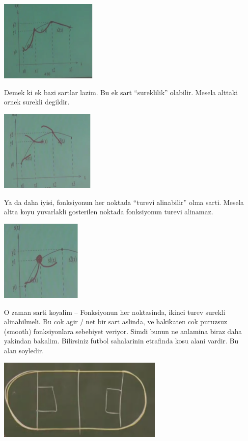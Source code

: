 \documentclass[12pt,fleqn]{article}\usepackage{../common}
\begin{document}
\includegraphics[height=4cm]{spline3.png}

Demek ki ek bazi sartlar lazim. Bu ek sart ``sureklilik'' olabilir. Mesela
alttaki ornek surekli degildir.

\includegraphics[height=4cm]{spline5.png}

Ya da daha iyisi, fonksiyonun her noktada ``turevi alinabilir'' olma
sarti. Mesela altta koyu yuvarlakli gosterilen noktada fonksiyonun turevi
alinamaz.

\includegraphics[height=4cm]{spline4.png}

O zaman sarti koyalim -- Fonksiyonun her noktasinda, ikinci turev surekli
alinabilmeli. Bu cok agir / net bir sart aslinda, ve hakikaten cok puruzsuz
(smooth) fonksiyonlara sebebiyet veriyor. Simdi bunun ne anlamina biraz
daha yakindan bakalim. Bilirsiniz futbol sahalarinin etrafinda kosu alani
vardir. Bu alan soyledir.

\includegraphics[height=4cm]{spline6.png}
\end{document}
